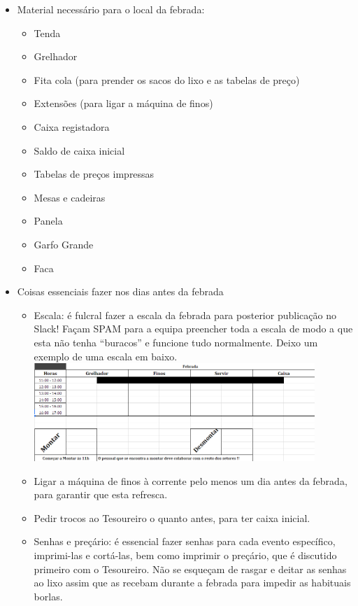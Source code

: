 \begin{itemize}
    \item Material necessário para o local da febrada:
    \begin{itemize}
        \item Tenda
        \item Grelhador
        \item Fita cola (para prender os sacos do lixo e as tabelas de preço)
        \item Extensões (para ligar a máquina de finos)
        \item Caixa registadora
        \item Saldo de caixa inicial
        \item Tabelas de preços impressas
        \item Mesas e cadeiras
        \item Panela
        \item Garfo Grande
        \item Faca
    \end{itemize}

    \item Coisas essenciais fazer nos dias antes da febrada
    \begin{itemize}
        \item Escala: é fulcral fazer a escala da febrada para posterior publicação no Slack! Façam SPAM para a equipa preencher toda a escala de modo a que esta não tenha “buracos” e funcione tudo normalmente. Deixo um exemplo de uma escala em baixo.\\
        \includegraphics[width=0.88\textwidth]{imagens/escalas.png}
        \item Ligar a máquina de finos à corrente pelo menos um dia antes da febrada, para garantir que esta refresca.
        \item Pedir trocos ao Tesoureiro o quanto antes, para ter caixa inicial.
        \item Senhas e preçário: é essencial fazer senhas para cada evento específico, imprimi-las e cortá-las, bem como imprimir o preçário, que é discutido primeiro com o Tesoureiro. Não se esqueçam de rasgar e deitar as senhas ao lixo assim que as recebam durante a febrada para impedir as habituais borlas.
    \end{itemize}


\end{itemize}
